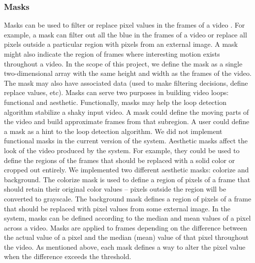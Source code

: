 \subsubsection{Masks}
\label{sec:Masks}
Masks can be used to filter or replace pixel values in the frames of a video \cite{Piccardi2004}. For example, a mask can filter out all the blue in the frames of a video or replace all pixels outside a particular region with pixels from an external image. A mask might also indicate the region of frames where interesting motion exists throughout a video. 
In the scope of this project, we define the mask as a single two-dimensional array with the same height and width as the frames of the video. The mask may also have associated data (used to make filtering decisions, define replace values, etc). 
Masks can serve two purposes in building video loops: functional and aesthetic. Functionally, masks may help the loop detection algorithm stabilize a shaky input video. A mask could define the moving parts of the video and build approximate frames from that subregion. A user could define a mask as a hint to the loop detection algorithm. We did not implement functional masks in the current version of the system.
Aesthetic masks affect the look of the video produced by the system. For example, they could be used to define the regions of the frames that should be replaced with a solid color or cropped out entirely. We implemented two different aesthetic masks: colorize and background. The colorize mask is used to define a region of pixels of a frame that should retain their original color values -- pixels outside the region will be converted to grayscale. The background mask defines a region of pixels of a frame that should be replaced with pixel values from some external image. 
In the system, masks can be defined according to the median and mean values of a pixel across a video. Masks are applied to frames depending on the difference between the actual value of a pixel and the median (mean) value of that pixel throughout the video. As mentioned above, each mask defines a way to alter the pixel value when the difference exceeds the threshold. 
